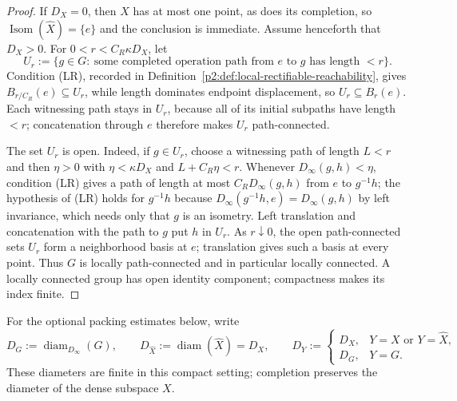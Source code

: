 \documentclass[11pt,a4paper]{article}
\begin{document}
\begin{proof}
If \(D_X=0\), then \(X\) has at most one point, as does its completion, so
\(\operatorname{Isom}(\widehat X)=\{e\}\) and the conclusion is immediate.
Assume henceforth that \(D_X>0\).
For \(0<r<C_R\kappa D_X\), let
\[
 U_r:=\{g\in G:\ \text{some completed operation path from }e
 \text{ to }g\text{ has length }<r\}.
\]
Condition (LR), recorded in
Definition~\ref{p2:def:local-rectifiable-reachability}, gives
\(B_{r/C_R}(e)\subseteq U_r\), while length dominates endpoint displacement,
so \(U_r\subseteq B_r(e)\).  Each witnessing path stays in \(U_r\), because
all of its initial subpaths have length \(<r\); concatenation through \(e\)
therefore makes \(U_r\) path-connected.

The set \(U_r\) is open.  Indeed, if \(g\in U_r\), choose a witnessing path
of length \(L<r\) and then \(\eta>0\) with
\(\eta<\kappa D_X\) and \(L+C_R\eta<r\).  Whenever
\(D_\infty(g,h)<\eta\), condition (LR) gives a path of length
at most \(C_R D_\infty(g,h)\) from \(e\) to \(g^{-1}h\); the hypothesis of
(LR) holds for \(g^{-1}h\) because \(D_\infty(g^{-1}h,e)=D_\infty(g,h)\) by
left invariance, which needs only that \(g\) is an isometry.  Left translation
and concatenation with the path to \(g\) put \(h\) in \(U_r\).
As \(r\downarrow0\), the open path-connected sets \(U_r\) form a
neighborhood basis at \(e\); translation gives such a basis at every point.
Thus \(G\) is locally path-connected and in particular locally connected.
A locally connected group has open identity component; compactness makes
its index finite.
\end{proof}

For the optional packing estimates below, write
\[
 D_G:=\operatorname{diam}_{D_\infty}(G),
 \qquad
 D_{\widehat X}:=\operatorname{diam}(\widehat X)=D_X,
 \qquad
 D_Y:=
 \begin{cases}
 D_X,&Y=X\text{ or }Y=\widehat X,\\
 D_G,&Y=G.
 \end{cases}
\]
These diameters are finite in this compact setting; completion preserves the
diameter of the dense subspace \(X\).
\end{document}
